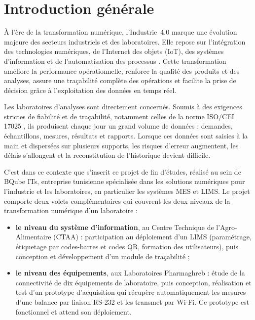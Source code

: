 \chapter*{Introduction générale}

À l'ère de la transformation numérique, l'Industrie~4.0 marque une évolution majeure des secteurs industriels et des laboratoires. Elle repose sur l'intégration des technologies numériques, de l'Internet des objets (\ac{IoT}), des systèmes d'information et de l'automatisation des processus \citep{kagermann2013,lasi2014}. Cette transformation améliore la performance opérationnelle, renforce la qualité des produits et des analyses, assure une traçabilité complète des opérations et facilite la prise de décision grâce à l'exploitation des données en temps réel.

Les laboratoires d'analyses sont directement concernés. Soumis à des exigences strictes de fiabilité et de traçabilité, notamment celles de la norme \ac{ISO/CEI 17025} \citep{iso17025}, ils produisent chaque jour un grand volume de données : demandes, échantillons, mesures, résultats et rapports. Lorsque ces données sont saisies à la main et dispersées sur plusieurs supports, les risques d'erreur augmentent, les délais s'allongent et la reconstitution de l'historique devient difficile.

C'est dans ce contexte que s'inscrit ce projet de fin d'études, réalisé au sein de BQube ITs, entreprise tunisienne spécialisée dans les solutions numériques pour l'industrie et les laboratoires, en particulier les systèmes \ac{MES} et \ac{LIMS}. Le projet comporte deux volets complémentaires qui couvrent les deux niveaux de la transformation numérique d'un laboratoire :
\begin{itemize}
  \item \textbf{le niveau du système d'information}, au Centre Technique de l'Agro-Alimentaire (\ac{CTAA}) : participation au déploiement d'un \ac{LIMS} (paramétrage, étiquetage par codes-barres et codes \ac{QR}, formation des utilisateurs), puis conception et développement d'un module de traçabilité ;
  \item \textbf{le niveau des équipements}, aux Laboratoires Pharmaghreb : étude de la connectivité de dix équipements de laboratoire, puis conception, réalisation et test d'un prototype d'acquisition qui récupère automatiquement les mesures d'une balance par liaison \ac{RS-232} et les transmet par \ac{Wi-Fi}. Ce prototype est fonctionnel et attend son déploiement.
\end{itemize}

